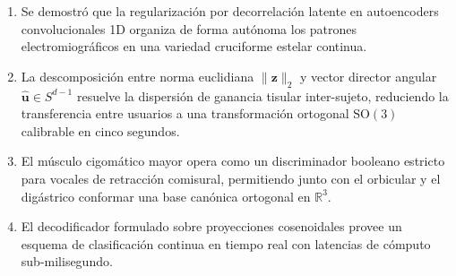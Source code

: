\documentclass[11pt,a4paper]{article}
\begin{document}
\begin{enumerate}
    \item Se demostró que la regularización por decorrelación latente en autoencoders convolucionales 1D organiza de forma autónoma los patrones electromiográficos en una variedad cruciforme estelar continua.
    \item La descomposición entre norma euclidiana $\|\mathbf{z}\|_2$ y vector director angular $\hat{\mathbf{u}} \in S^{d-1}$ resuelve la dispersión de ganancia tisular inter-sujeto, reduciendo la transferencia entre usuarios a una transformación ortogonal $\text{SO}(3)$ calibrable en cinco segundos.
    \item El músculo cigomático mayor opera como un discriminador booleano estricto para vocales de retracción comisural, permitiendo junto con el orbicular y el digástrico conformar una base canónica ortogonal en $\mathbb{R}^3$.
    \item El decodificador formulado sobre proyecciones cosenoidales provee un esquema de clasificación continua en tiempo real con latencias de cómputo sub-milisegundo.
\end{enumerate}
\end{document}
